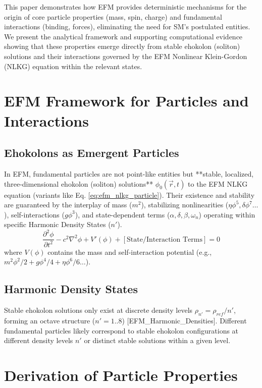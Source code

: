 \documentclass[11pt]{article}
\begin{document}
This paper demonstrates how EFM provides deterministic mechanisms for the origin of core particle properties (mass, spin, charge) and fundamental interactions (binding, forces), eliminating the need for SM's postulated entities. We present the analytical framework and supporting computational evidence showing that these properties emerge directly from stable ehokolon (soliton) solutions and their interactions governed by the EFM Nonlinear Klein-Gordon (NLKG) equation within the relevant states.

\section{EFM Framework for Particles and Interactions}
\subsection{Ehokolons as Emergent Particles}
In EFM, fundamental particles are not point-like entities but **stable, localized, three-dimensional ehokolon (soliton) solutions** \(\phi_0(\vec{r}, t)\) to the EFM NLKG equation (variants like Eq. \ref{eq:efm_nlkg_particle}). Their existence and stability are guaranteed by the interplay of mass (\(m^2\)), stabilizing nonlinearities (\(\eta\phi^5, \delta\phi^7\dots\)), self-interactions (\(g\phi^3\)), and state-dependent terms (\(\alpha, \delta, \beta, \omega_n\)) operating within specific Harmonic Density States (\(n'\)).
\begin{equation}
\frac{\partial^2 \phi}{\partial t^2} - c^2 \nabla^2 \phi + V'(\phi) + [\text{State/Interaction Terms}] = 0
\label{eq:efm_nlkg_particle}
\end{equation}
where \(V(\phi)\) contains the mass and self-interaction potential (e.g., \(m^2\phi^2/2 + g\phi^4/4 + \eta\phi^6/6 \dots\)).

\subsection{Harmonic Density States}
Stable ehokolon solutions only exist at discrete density levels \(\rho_{n'} = \rho_{ref}/n'\), forming an octave structure (\(n'=1..8\)) [EFM\_Harmonic\_Densities]. Different fundamental particles likely correspond to stable ehokolon configurations at different density levels \(n'\) or distinct stable solutions within a given level.

\section{Derivation of Particle Properties}
\end{document}
